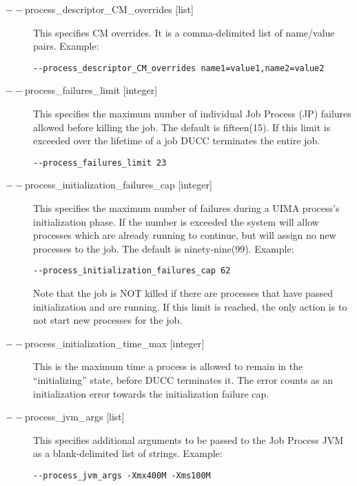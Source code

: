 \begin{description}
           \item[$--$process\_descriptor\_CM\_overrides {[list]}  ]

             This specifies CM overrides. It is a comma-delimited list of name/value pairs. Example: 
             \begin{verbatim}
--process_descriptor_CM_overrides name1=value1,name2=value2 
\end{verbatim}
             
           \item[$--$process\_failures\_limit {[integer]} ]

             This specifies the maximum number of individual Job Process (JP) failures allowed
             before killing the job. The default is fifteen(15). If this limit is exceeded over the lifetime 
             of a job DUCC terminates the entire job. 
             \begin{verbatim}
--process_failures_limit 23
\end{verbatim}
                          
           \item[$--$process\_initialization\_failures\_cap {[integer]} ] This specifies the maximum
             number of failures during a UIMA process's initialization phase.  If the number is
             exceeded the system will allow processes which are already running to continue, but
             will assign no new processes to the job.  The default is ninety-nine(99). Example:
             \begin{verbatim}
--process_initialization_failures_cap 62 
             \end{verbatim}
             
             Note that the job is NOT killed if there are processes that have passed initialization and are 
             running. If this limit is reached, the only action is to not start new processes for the job. 

           \item[$--$process\_initialization\_time\_max {[integer]}] This is the maximum time a process
             is allowed to remain in the ``initializing'' state, before DUCC terminates it.  The error
             counts as an initialization error towards the initialization failure cap.

           \item[$--$process\_jvm\_args {[list]} ] This specifies additional arguments to be passed to
             the Job Process JVM as a blank-delimited list of strings. Example:
             \begin{verbatim}
--process_jvm_args -Xmx400M -Xms100M
             \end{verbatim}


\end{description}
